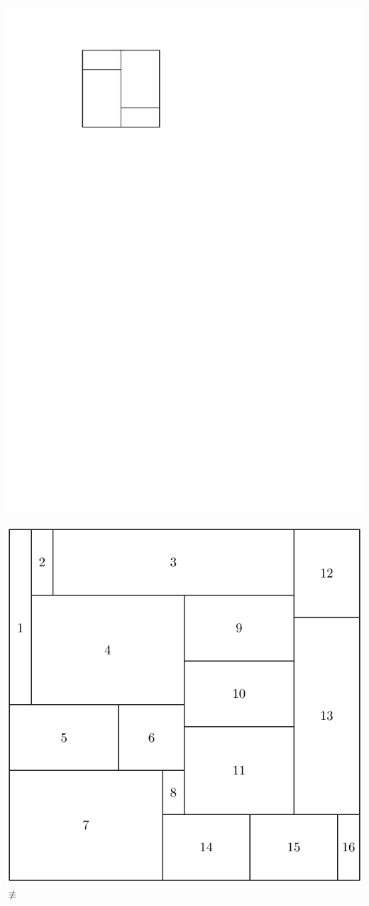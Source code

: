 \documentclass[11pt]{beamer}%
\begin{document}
\begin{frame}
\begin{center}
      \includegraphics[page=2,height=.1\textheight]{figures.pdf}
    \end{center}   
    \begin{center}
      \includegraphics[height=.4\textheight]{strongRectangulation.pdf} $\not\equiv$ 

\end{center}
\end{frame}
\end{document}
